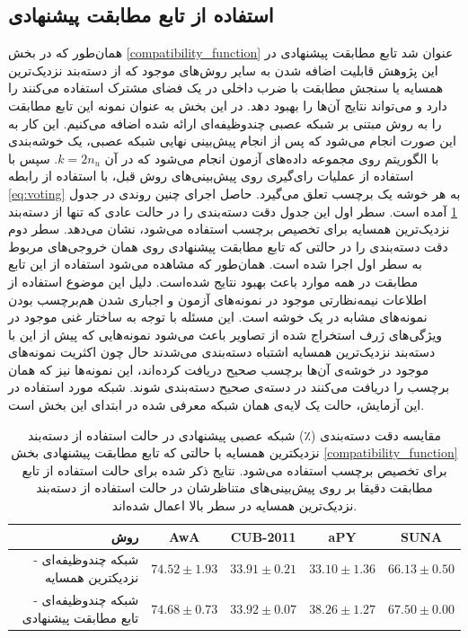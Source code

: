 \subsection{استفاده از تابع مطابقت پیشنهادی}\label{exp:nn_comp}
همان‌طور که در بخش \ref{compatibility_function} عنوان شد تابع مطابقت پیشنهادی  در این پژوهش قابلیت اضافه شدن به سایر روش‌های موجود که از دسته‌بند نزدیک‌ترین همسایه یا سنجش مطابقت با ضرب داخلی در یک فضای مشترک استفاده می‌کنند را دارد و می‌تواند نتایج آن‌ها را بهبود دهد. در این بخش به عنوان نمونه این تابع مطابقت را به روش مبتنی بر شبکه عصبی چندوظیفه‌ای ارائه شده اضافه می‌کنیم. این کار به این صورت انجام می‌شود که پس از انجام پیش‌بینی نهایی شبکه عصبی، یک خوشه‌بندی با الگوریتم  روی مجموعه داده‌های آزمون انجام می‌شود که در آن $k=2n_u$. سپس با استفاده از عملیات رای‌گیری روی پیش‌بینی‌های روش قبل، با استفاده از رابطه \eqref{eq:voting} به هر خوشه یک برچسب تعلق می‌گیرد. حاصل اجرای چنین روندی در جدول \ref{tab:nn_comp} آمده است. سطر اول این جدول دقت دسته‌بندی را در حالت عادی که تنها از دسته‌بند نزدیک‌ترین همسایه برای تخصیص برچسب استفاده می‌شود، نشان می‌دهد. سطر دوم دقت دسته‌بندی را در حالتی که تابع مطابقت پیشنهادی روی همان خروجی‌های مربوط به سطر اول اجرا شده است. همان‌طور که مشاهده می‌شود استفاده از این تابع مطابقت در همه موارد باعث بهبود نتایج شده‌است. دلیل این موضوع استفاده از اطلاعات نیمه‌نظارتی موجود در نمونه‌های آزمون و  اجباری شدن هم‌برچسب بودن نمونه‌های مشابه در یک خوشه است.  این مسئله با توجه به ساختار غنی موجود در ویژگی‌های ژرف استخراج شده از تصاویر باعث می‌شود نمونه‌هایی که پیش از این با دسته‌بند نزدیک‌ترین همسایه اشتباه دسته‌بندی می‌شدند حال چون اکثریت نمونه‌های موجود در خوشه‌ی آن‌ها برچسب صحیح دریافت کرده‌اند، این نمونه‌ها نیز که همان برچسب را دریافت می‌کنند در دسته‌ی صحیح دسته‌بندی شوند.
 شبکه مورد استفاده در این آزمایش، حالت یک لایه‌ی همان شبکه معرفی شده در ابتدای این بخش است.
\begin{table}[t]
\caption [دقت دسته‌بندی با شبکه عصبی به همراه تابع مطابقت پیشنهادی]{
مقایسه دقت دسته‌بندی (٪) شبکه عصبی پیشنهادی در حالت استفاده از دسته‌بند نزدیکترین همسایه با حالتی که تابع مطابقت پیشنهادی بخش  \ref{compatibility_function} برای تخصیص برچسب استفاده می‌شود.
نتایج ذکر شده برای حالت استفاده از تابع مطابقت دقیقا بر روی پیش‌بینی‌های متناظرشان در حالت استفاده از دسته‌بند نزدیک‌ترین همسایه در سطر بالا اعمال شده‌اند.
}
\label{tab:nn_comp}
\begin{center}
\begin{tabular}{|r|c|c|c|c|}
\hline
روش  & AwA & CUB-2011 & aPY & SUNA \\
\hline
شبکه چندوظیفه‌ای - نزدیکترین همسایه
                & {${74.52 \pm 1.93}$}  & {${33.91 \pm 0.21}$} & ${33.10 \pm 1.36}$ & { ${66.13 \pm 0.50}$} \\ \hline
شبکه  چندوظیفه‌ای - تابع مطابقت پیشنهادی
                      & $74.68 \pm 0.73$  & \textbf{${33.92 \pm 0.07}$} & \textbf{${38.26 \pm 1.27}$} & \textbf{ ${67.50 \pm 0.00}$} \\ \hline
\end{tabular}

\end{center}
\end{table}

